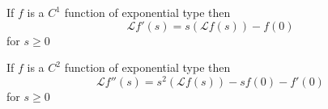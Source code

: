 \documentclass[notes]{subfiles}
\begin{document}
\begin{corollary}
    If $f$ is a $C^1$ function of exponential type then
    \[
        \mathcal{L}f'(s) = s(\mathcal{L}f(s)) - f(0)
    \]
    for $s \geq 0$
\end{corollary}

\begin{corollary}
    If $f$ is a $C^2$ function of exponential type then
    \[
        \mathcal{L}f''(s) = s^2(\mathcal{L}f(s)) - sf(0) - f'(0)
    \]
    for $s \geq 0$
\end{corollary}
\end{document}
